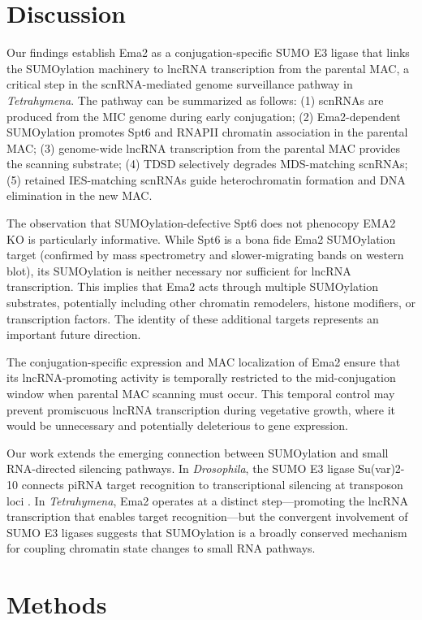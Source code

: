 \documentclass[11pt]{article}
\begin{document}
\section{Discussion}

Our findings establish Ema2 as a conjugation-specific SUMO E3 ligase that links the SUMOylation machinery to lncRNA transcription from the parental MAC, a critical step in the scnRNA-mediated genome surveillance pathway in \textit{Tetrahymena}. The pathway can be summarized as follows: (1) scnRNAs are produced from the MIC genome during early conjugation; (2) Ema2-dependent SUMOylation promotes Spt6 and RNAPII chromatin association in the parental MAC; (3) genome-wide lncRNA transcription from the parental MAC provides the scanning substrate; (4) TDSD selectively degrades MDS-matching scnRNAs; (5) retained IES-matching scnRNAs guide heterochromatin formation and DNA elimination in the new MAC.

The observation that SUMOylation-defective Spt6 does not phenocopy EMA2 KO is particularly informative. While Spt6 is a bona fide Ema2 SUMOylation target (confirmed by mass spectrometry and slower-migrating bands on western blot), its SUMOylation is neither necessary nor sufficient for lncRNA transcription. This implies that Ema2 acts through multiple SUMOylation substrates, potentially including other chromatin remodelers, histone modifiers, or transcription factors. The identity of these additional targets represents an important future direction.

The conjugation-specific expression and MAC localization of Ema2 ensure that its lncRNA-promoting activity is temporally restricted to the mid-conjugation window when parental MAC scanning must occur. This temporal control may prevent promiscuous lncRNA transcription during vegetative growth, where it would be unnecessary and potentially deleterious to gene expression.

Our work extends the emerging connection between SUMOylation and small RNA-directed silencing pathways. In \textit{Drosophila}, the SUMO E3 ligase Su(var)2-10 connects piRNA target recognition to transcriptional silencing at transposon loci \citep{ninova2020suvar}. In \textit{Tetrahymena}, Ema2 operates at a distinct step---promoting the lncRNA transcription that enables target recognition---but the convergent involvement of SUMO E3 ligases suggests that SUMOylation is a broadly conserved mechanism for coupling chromatin state changes to small RNA pathways.

\section{Methods}
\end{document}
